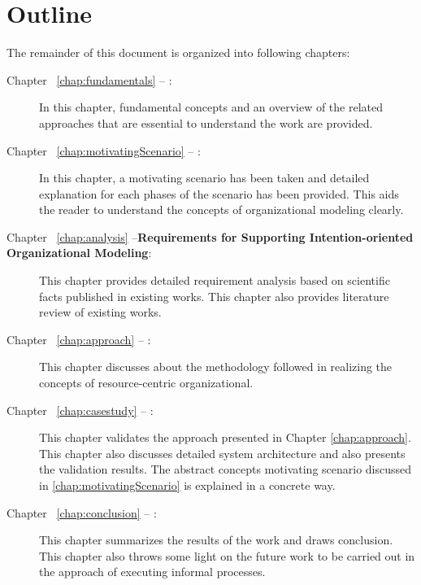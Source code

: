 \section {Outline}
\label{sec:outline}
The remainder of this document is organized into following chapters:
\begin{description}
	\item[Chapter ~\ref{chap:fundamentals} -- :] In this chapter, fundamental concepts and an overview of the related approaches that are essential to understand the work are provided.
	\item[Chapter ~\ref{chap:motivatingScenario} -- :] In this chapter, a motivating scenario has been taken and detailed explanation for each phases of the scenario has been provided. This aids the reader to understand the concepts of organizational modeling clearly. 
	\item[Chapter ~\ref{chap:analysis} --\textbf{Requirements for Supporting Intention-oriented Organizational Modeling}:] This chapter provides detailed requirement analysis based on scientific facts published in existing works. This chapter also provides literature review of existing works.
	\item[Chapter ~\ref{chap:approach} -- :] This chapter discusses about the methodology followed in realizing the concepts  of resource-centric organizational.
	\item[Chapter ~\ref{chap:casestudy} -- :] This chapter validates the approach presented in Chapter \ref{chap:approach}. This chapter also discusses detailed system architecture and also presents the validation results. The abstract concepts motivating scenario discussed in \ref{chap:motivatingScenario} is explained in a concrete way.	
	\item[Chapter ~\ref{chap:conclusion} -- :] This chapter summarizes the results of the work and draws conclusion. This chapter also throws some light on the future work to be carried out in the approach of executing informal processes. 
\end{description}